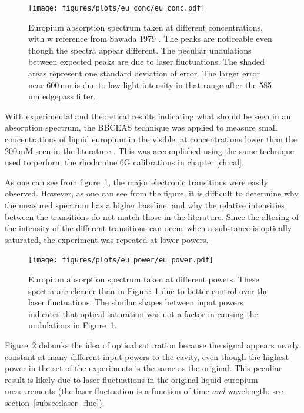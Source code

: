 \begin{figure}[t]
\begin{center}
\texttt{[image: figures/plots/eu\_conc/eu\_conc.pdf]}
\end{center}
\caption[Europium Absorption Spectra at different Concentrations]{Europium absorption spectrum taken at different concentrations, with w reference from Sawada 1979 \cite{Sawada:1979vca}. The peaks are noticeable even though the spectra appear different. The peculiar undulations between expected peaks are due to laser fluctuations. The shaded areas represent one standard deviation of error. The larger error near 600\,nm is due to low light intensity in that range after the 585\,nm edgepass filter.}
\label{fig:eu_conc}
\end{figure}

With experimental and theoretical results indicating what should be seen in an
absorption spectrum, the \ac{BBCEAS} technique was applied to measure small
concentrations of liquid europium in the visible, at concentrations lower than
the 200\,mM seen in the literature \cite{Sawada:1979vca}. This was accomplished
using the same technique used to perform the rhodamine 6G calibrations in chapter \ref{ch:cal}.

As one can see from figure~\ref{fig:eu_conc}, the major electronic transitions
were easily observed. However, as one can see from the figure, it is difficult
to determine why the measured spectrum has a higher baseline, and why the
relative intensities between the transitions do not match those in the
literature. Since the altering of the intensity of the different transitions
can occur when a substance is optically saturated, the experiment was repeated
at lower powers.

\begin{figure}[t]
\begin{center}
  \texttt{[image: figures/plots/eu\_power/eu\_power.pdf]}
\end{center}
\caption[Europium Absorption Spectra at different Input Intensities]{Europium absorption spectrum taken at different powers. These spectra are cleaner than in Figure~\ref{fig:eu_conc} due to better control over the laser fluctuations. The similar shapes between input powers indicates that optical saturation was not a factor in causing the undulations in Figure~\ref{fig:eu_conc}.}
\label{fig:eu_power}
\end{figure}

Figure~\ref{fig:eu_power} debunks the idea of optical saturation because the
signal appears nearly constant at many different input powers to the cavity,
even though the highest power in the set of the experiments is the same as the
original. This peculiar result is likely due to laser fluctuations in the
original liquid europium measurements (the laser fluctuation is a function of
time \emph{and} wavelength: see section~\ref{subsec:laser_fluc}).


